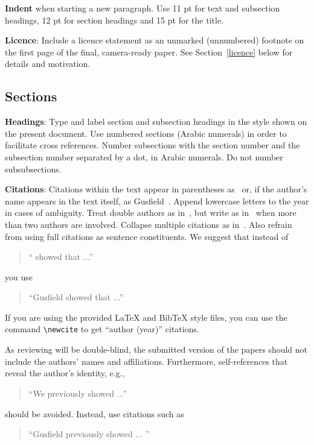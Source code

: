 {\bf Indent} when starting a new paragraph. Use 11 pt for text and 
subsection headings, 12 pt for section headings and 15 pt for
the title. 

{\bf Licence}: Include a licence statement as an unmarked (unnumbered)
footnote on the first page of the final, camera-ready paper.
See Section~\ref{licence} below for details and motivation.


\subsection{Sections}

{\bf Headings}: Type and label section and subsection headings in the
style shown on the present document.  Use numbered sections (Arabic
numerals) in order to facilitate cross references. Number subsections
with the section number and the subsection number separated by a dot,
in Arabic numerals. Do not number subsubsections.

{\bf Citations}: Citations within the text appear in parentheses
as~\cite{Gusfield:97} or, if the author's name appears in the text
itself, as Gusfield~.  Append lowercase letters
to the year in cases of ambiguity.  Treat double authors as
in~\cite{Aho:72}, but write as in~\cite{Chandra:81} when more than two
authors are involved. Collapse multiple citations as
in~\cite{Gusfield:97,Aho:72}. Also refrain from using full citations
as sentence constituents. We suggest that instead of
\begin{quote}
  ``\cite{Gusfield:97} showed that ...''
\end{quote}
you use
\begin{quote}
``Gusfield    showed that ...''
\end{quote}

If you are using the provided \LaTeX{} and Bib\TeX{} style files, you
can use the command \verb|\newcite| to get ``author (year)'' citations.

As reviewing will be double-blind, the submitted version of the papers
should not include the authors' names and affiliations. Furthermore,
self-references that reveal the author's identity, e.g.,
\begin{quote}
``We previously showed \cite{Gusfield:97} ...''  
\end{quote}
should be avoided. Instead, use citations such as 
\begin{quote}
``Gusfield 
previously showed ... ''
\end{quote}

